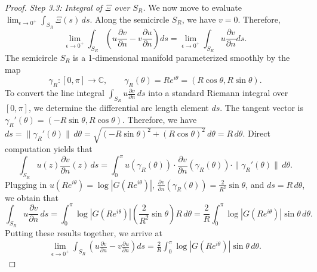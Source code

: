 \documentclass[11pt,twoside]{article} %
\begin{document}
\begin{proof}
\textit{Step 3.3: Integral of $\Xi$ over $S_R$. } We now move to evaluate $\lim_{\epsilon \to 0^+} \int_{S_{R}} \Xi(s)\,ds$. Along the semicircle $S_{R}$, we have $v = 0$. Therefore, 
$$\lim_{\epsilon \to 0^+} \int_{S_{R}} \left( u \frac{\partial v}{\partial n} - v \frac{\partial u}{\partial n} \right) ds = \lim_{\epsilon \to 0^+} \int_{S_{R}} u \frac{\partial v}{\partial n} ds.$$
The semicircle $S_R$ is a 1-dimensional manifold parameterized smoothly by the map 
$$\gamma_R: [0, \pi] \to \mathbb{C}, \qquad \gamma_R(\theta) = R e^{i\theta} = (R\cos\theta, R\sin\theta).$$
To convert the line integral $\int_{S_R} u \frac{\partial v}{\partial n} \, ds$ into a standard Riemann integral over $[0, \pi]$, we determine the differential arc length element $ds$. The tangent vector is $\gamma_R'(\theta) = (-R\sin\theta, R\cos\theta)$. Therefore, we have $ds = \|\gamma_R'(\theta)\| \, d\theta = \sqrt{(-R\sin\theta)^2 + (R\cos\theta)^2} \, d\theta = R \, d\theta$. Direct computation yields that
$$\int_{S_R} u(z) \frac{\partial v}{\partial n}(z) \, ds = \int_0^\pi u(\gamma_R(\theta)) \cdot \frac{\partial v}{\partial n}(\gamma_R(\theta)) \cdot \|\gamma_R'(\theta)\| \, d\theta.$$
Plugging in $u(Re^{i\theta}) = \log|G(Re^{i\theta})|$, $\frac{\partial v}{\partial n}(\gamma_{R}(\theta)) = \frac{2}{R^2}\sin\theta$, and $ds = R \, d\theta$, we obtain that
$$\int_{S_R} u \frac{\partial v}{\partial n} \, ds = \int_0^\pi \log|G(Re^{i\theta})| \left( \frac{2}{R^2}\sin\theta \right) R \, d\theta = \frac{2}{R} \int_0^\pi \log|G(Re^{i\theta})| \sin\theta \, d\theta.$$
Putting these results together, we arrive at
\begin{align}
\lim_{\epsilon \to 0^+} \int_{S_{R}} \left( u \frac{\partial v}{\partial n} - v \frac{\partial u}{\partial n} \right) ds = \frac{2}{R} \int_0^\pi \log|G(Re^{i\theta})| \sin\theta \, d\theta. \label{eq:logarithmic_bound_3}
\end{align}


\end{proof}
\end{document}
